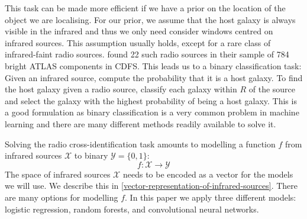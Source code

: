 \documentclass[fleqn,usenatbib,usedcolumn]{mnras}
\newcommand{\cheng}[1]{ {\color{teal}[{\bf Cheng:~{#1}}]} }
\begin{document}
    This task can be made more efficient if we have a prior on the location of
    the object we are localising. For our prior, we assume that the host galaxy
    is always visible in the infrared and thus we only need consider windows
    centred on infrared sources. This assumption usually holds, except for a
    rare class of infrared-faint radio sources. \citet{norris06} found 22
    such radio sources in their sample of 784 bright ATLAS components in CDFS.
    This leads us to a binary classification task: Given an infrared source,
    compute the probability that it is a host galaxy. To find the host galaxy
    given a radio source, classify each galaxy within
    \(R\) of the source and select the galaxy with the highest probability of
    being a host galaxy. This is a good formulation as binary classification
    is a very common problem in machine learning and there are many different
    methods readily available to solve it.

    Solving the radio cross-identification task amounts to modelling a
    function $f$ from infrared sources $\mathcal{X}$ to binary
    $\mathcal{Y} = \{0, 1\}$:
    \begin{equation}
        f : \mathcal{X} \to \mathcal{Y}
    \end{equation}
    The space of infrared sources $\mathcal{X}$ needs to be encoded as a vector
    for the models we will use. We describe this in
    \autoref{vector-representation-of-infrared-sources}. There are many options
    for modelling $f$. In this paper we apply three different models: logistic
    regression, random forests, and convolutional neural networks.
\end{document}
